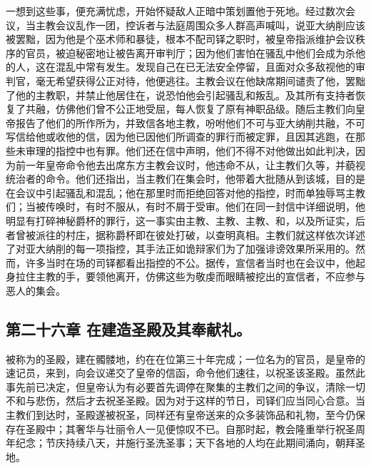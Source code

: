 一想到这些事，便充满忧虑，开始怀疑敌人正暗中策划置他于死地。经过数次会议，当主教会议乱作一团，控诉者与法庭周围众多人群高声喊叫，说亚大纳削应该被罢黜，因为他是个巫术师和暴徒，根本不配司铎之职时，被皇帝指派维护会议秩序的官员，被迫秘密地让被告离开审判厅；因为他们害怕在骚乱中他们会成为杀他的人，这在混乱中常有发生。发现自己在已无法安全停留，且面对众多敌视他的审判官，毫无希望获得公正对待，他便逃往。主教会议在他缺席期间谴责了他，罢黜了他的主教职，并禁止他居住在，说恐怕他会引起骚乱和叛乱。及其所有支持者恢复了共融，仿佛他们曾不公正地受屈，每人恢复了原有神职品级。随后主教们向皇帝报告了他们的所作所为，并致信各地主教，吩咐他们不可与亚大纳削共融，不可写信给他或收他的信，因为他已因他们所调查的罪行而被定罪，且因其逃跑，在那些未审理的指控中也有罪。他们还在信中声明，他们不得不对他做出如此判决，因为前一年皇帝命令他去出席东方主教会议时，他违命不从，让主教们久等，并藐视统治者的命令。他们还指出，当主教们在集会时，他带着大批随从到该城，目的是在会议中引起骚乱和混乱；他在那里时而拒绝回答对他的指控，时而单独辱骂主教们；当被传唤时，有时不服从，有时不屑于受审。他们在同一封信中详细说明，他明显有打碎神秘爵杯的罪行，这一事实由主教、主教、主教、和，以及所证实，后者曾被派往的村庄，据称爵杯即在彼处打破，以查明真相。主教们就这样依次详述了对亚大纳削的每一项指控，其手法正如诡辩家们为了加强诽谤效果所采用的。然而，许多当时在场的司铎都看出指控的不公。据传，宣信者当时也在会议中，他起身拉住主教的手，要领他离开，仿佛这些为敬虔而眼睛被挖出的宣信者，不应参与恶人的集会。\par


\subsection{第二十六章 在建造圣殿及其奉献礼。}

被称为的圣殿，建在髑髅地，约在在位第三十年完成；一位名为的官员，是皇帝的速记员，来到，向会议递交了皇帝的信函，命令他们速往，以祝圣该圣殿。虽然此事先前已决定，但皇帝认为有必要首先调停在聚集的主教们之间的争议，清除一切不和与悲伤，然后才去祝圣圣殿。因为对于这样的节日，司铎们应当同心合意。当主教们到达时，圣殿遂被祝圣，同样还有皇帝送来的众多装饰品和礼物，至今仍保存在圣殿中；其奢华与壮丽令人一见便惊叹不已。自那时起，教会隆重举行祝圣周年纪念；节庆持续八天，并施行圣洗圣事；天下各地的人均在此期间涌向，朝拜圣地。\par

